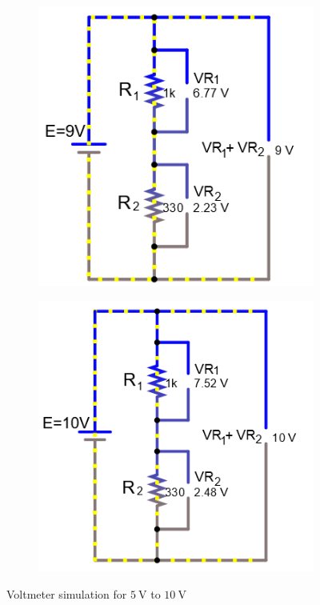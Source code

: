 \documentclass[a4paper]{article}
\begin{document}
\begin{figure}
\begin{subfigure}{0.48\textwidth}
\end{subfigure}
\begin{subfigure}{0.48\textwidth}
\includegraphics[width=1.03\linewidth]{volts_9}
\end{subfigure}
\begin{subfigure}{0.48\textwidth}
\includegraphics[width=1.03\linewidth]{volts_10}
\end{subfigure}
\caption{Voltmeter simulation for $\SI{5}{\volt}$ to $\SI{10}{\volt}$}
\end{figure}
\end{document}
